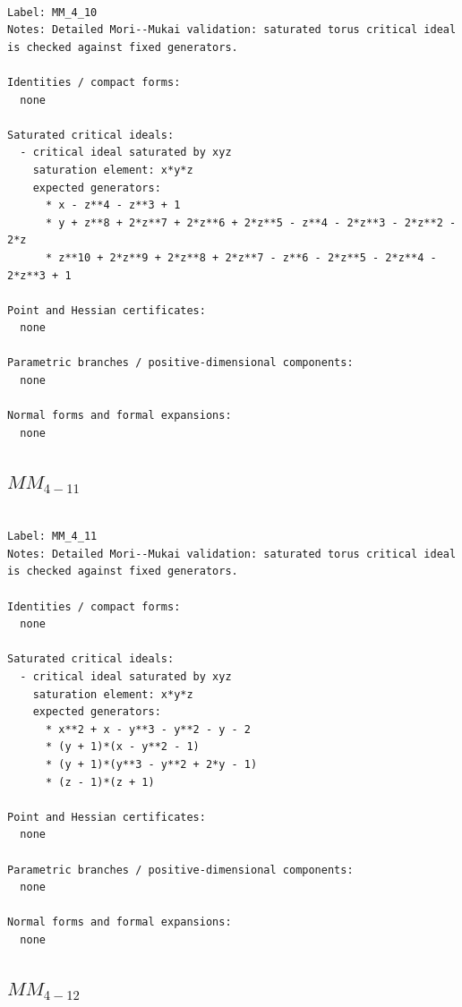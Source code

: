 \documentclass[10pt,a4paper]{article}
\begin{document}
\begin{lstlisting}

Label: MM_4_10
Notes: Detailed Mori--Mukai validation: saturated torus critical ideal is checked against fixed generators.

Identities / compact forms:
  none

Saturated critical ideals:
  - critical ideal saturated by xyz
    saturation element: x*y*z
    expected generators:
      * x - z**4 - z**3 + 1
      * y + z**8 + 2*z**7 + 2*z**6 + 2*z**5 - z**4 - 2*z**3 - 2*z**2 - 2*z
      * z**10 + 2*z**9 + 2*z**8 + 2*z**7 - z**6 - 2*z**5 - 2*z**4 - 2*z**3 + 1

Point and Hessian certificates:
  none

Parametric branches / positive-dimensional components:
  none

Normal forms and formal expansions:
  none

\end{lstlisting}

\subsection*{$ MM_{4-11} $}

\begin{lstlisting}

Label: MM_4_11
Notes: Detailed Mori--Mukai validation: saturated torus critical ideal is checked against fixed generators.

Identities / compact forms:
  none

Saturated critical ideals:
  - critical ideal saturated by xyz
    saturation element: x*y*z
    expected generators:
      * x**2 + x - y**3 - y**2 - y - 2
      * (y + 1)*(x - y**2 - 1)
      * (y + 1)*(y**3 - y**2 + 2*y - 1)
      * (z - 1)*(z + 1)

Point and Hessian certificates:
  none

Parametric branches / positive-dimensional components:
  none

Normal forms and formal expansions:
  none

\end{lstlisting}

\subsection*{$ MM_{4-12} $}
\end{document}
